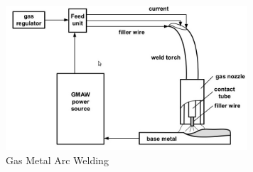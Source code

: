 \begin{figure}[htbp] %
 \centering
   \includegraphics[width=9cm]{images/GMAW.png}
   \caption[Gas Metal Arc Welding \citet{Pires2003}]
   {Gas Metal Arc Welding \citet{Pires2003}}  
\label{fig:img3}
\end{figure}

